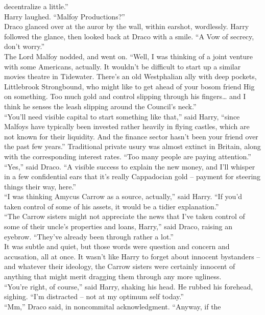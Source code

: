 decentralize a little.'' \\
Harry laughed. ``Malfoy Productions?'' \\
Draco glanced over at the auror by the wall, within earshot, wordlessly.
Harry followed the glance, then looked back at Draco with a smile. ``A
Vow of secrecy, don't worry.'' \\
The Lord Malfoy nodded, and went on. ``Well, I was thinking of a joint
venture with some Americans, actually. It wouldn't be difficult to start
up a similar movies theatre in Tidewater. There's an old Westphalian
ally with deep pockets, Littlebrook Strongbound, who might like to get
ahead of your bosom friend Hig on something. Too much gold and control
slipping through his fingers\ldots{} and I think he senses the leash
slipping around the Council's neck.'' \\
``You'll need visible capital to start something like that,'' said
Harry, ``since Malfoys have typically been invested rather heavily in
flying castles, which are not known for their liquidity. And the finance
sector hasn't been your friend over the past few years.'' Traditional
private usury was almost extinct in Britain, along with the
corresponding interest rates. ``Too many people are paying
attention.'' \\
``Yes,'' said Draco. ``A visible success to explain the new money, and
I'll whisper in a few confidential ears that it's really Cappadocian
gold -- payment for steering things their way, here.'' \\
``I was thinking Amycus Carrow as a source, actually,'' said Harry. ``If
you'd taken control of some of his assets, it would be a tidier
explanation.'' \\
``The Carrow sisters might not appreciate the news that I've taken
control of some of their uncle's properties and loans, Harry,'' said
Draco, raising an eyebrow. ``They've already been through rather a
lot.'' \\
It was subtle and quiet, but those words were question and concern and
accusation, all at once. It wasn't like Harry to forget about innocent
bystanders -- and whatever their ideology, the Carrow sisters were
certainly innocent of anything that might merit dragging them through
any more ugliness. \\
``You're right, of course,'' said Harry, shaking his head. He rubbed his
forehead, sighing. ``I'm distracted -- not at my optimum self
today.'' \\
``Mm,'' Draco said, in noncommital acknowledgment. ``Anyway, if the
